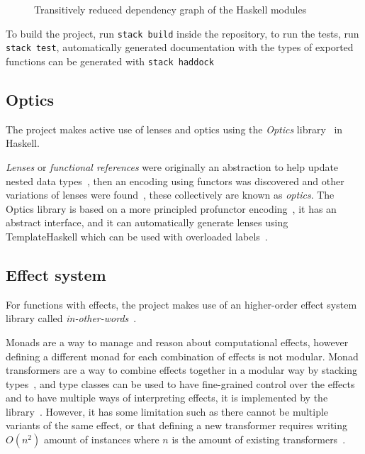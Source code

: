 \begin{figure}
  \resizebox{\textwidth}{!}{}
  \caption{Transitively reduced dependency graph of the Haskell modules
  }\label{fig:modules}
\end{figure}

To build the project, run \texttt{stack build} inside the repository,
to run the tests, run \texttt{stack test}, automatically generated
documentation with the types of exported functions can be generated with
\texttt{stack haddock}

\subsection{Optics}\label{ssec:optics}

The project makes active use of lenses and optics using the \emph{Optics}
library~\cite{optics} in Haskell.

\emph{Lenses} or \emph{functional references} were originally an abstraction to
help update nested data types~\cite{viewupdate}, then an encoding using functors
was discovered and other variations of lenses were found~\cite{vanlaarhoven,
  lens}, these collectively are known as \emph{optics}. The Optics library is
based on a more principled profunctor encoding~\cite{profunctor}, it has an
abstract interface, and it can automatically generate lenses using
TemplateHaskell which can be used with overloaded labels~\cite{optics}.

\subsection{Effect system}\label{ssec:effect}

For functions with effects, the project makes use of an higher-order effect
system library called \emph{in-other-words}~\cite{inotherwords}.

Monads are a way to manage and reason about computational effects, however
defining a different monad for each combination of effects is not modular. Monad
transformers are a way to combine effects together in a modular way by stacking
types~\cite{transformers}, and type classes can be used to have fine-grained
control over the effects and to have multiple ways of interpreting effects, it
is implemented by the \emph{} library~\cite{mtl}. However, it has some
limitation such as there cannot be multiple variants of the same effect, or that
defining a new transformer requires writing \(O(n^2)\) amount of instances where
\(n\) is the amount of existing transformers~\cite{effect}.

